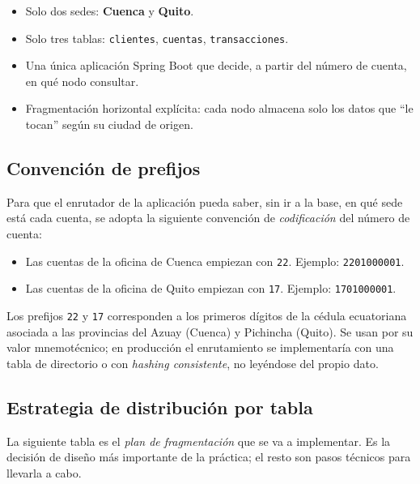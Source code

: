 \documentclass[11pt,a4paper]{article}
\begin{document}
\begin{itemize}[leftmargin=1.2em]
    \item Solo dos sedes: \textbf{Cuenca} y \textbf{Quito}.
    \item Solo tres tablas: \texttt{clientes}, \texttt{cuentas}, \texttt{transacciones}.
    \item Una \'unica aplicaci\'on Spring Boot que decide, a partir del n\'umero de cuenta, en qu\'e nodo consultar.
    \item Fragmentaci\'on horizontal expl\'icita: cada nodo almacena solo los datos que ``le tocan'' seg\'un su ciudad de origen.
\end{itemize}

\subsection{Convenci\'on de prefijos}

Para que el enrutador de la aplicaci\'on pueda saber, sin ir a la base, en qu\'e sede est\'a cada cuenta, se adopta la siguiente convenci\'on de \emph{codificaci\'on} del n\'umero de cuenta:

\begin{itemize}[leftmargin=1.2em]
    \item Las cuentas de la oficina de Cuenca empiezan con \texttt{22}. Ejemplo: \texttt{2201000001}.
    \item Las cuentas de la oficina de Quito empiezan con \texttt{17}. Ejemplo: \texttt{1701000001}.
\end{itemize}

\begin{notabox}
Los prefijos \texttt{22} y \texttt{17} corresponden a los primeros d\'igitos de la c\'edula ecuatoriana asociada a las provincias del Azuay (Cuenca) y Pichincha (Quito). Se usan por su valor mnemot\'ecnico; en producci\'on el enrutamiento se implementar\'ia con una tabla de directorio o con \emph{hashing consistente}, no ley\'endose del propio dato.
\end{notabox}

\subsection{Estrategia de distribuci\'on por tabla}

La siguiente tabla es el \emph{plan de fragmentaci\'on} que se va a implementar. Es la decisi\'on de dise\~no m\'as importante de la pr\'actica; el resto son pasos t\'ecnicos para llevarla a cabo.
\end{document}
